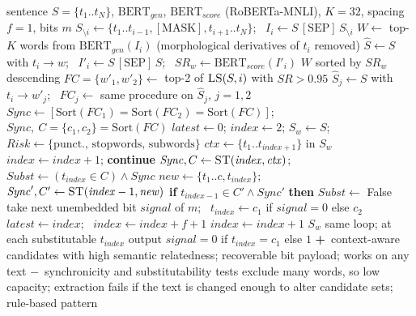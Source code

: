 \documentclass[10pt,a4paper,twocolumn]{article}
\newcommand{\pro}[1]{\Statex\textcolor{proc}{\textbf{+}\ #1}}
\newcommand{\con}[1]{\Statex\textcolor{conc}{\textbf{$-$}\ #1}}
\begin{document}
\begin{algorithm}[H]\small
\caption{Context-aware lexical substitution watermark (Yang et al.\ 2022)}
\begin{algorithmic}[1]
\Require sentence $S=\{t_1..t_N\}$, $\mathrm{BERT}_{gen}$, $\mathrm{BERT}_{score}$ (RoBERTa-MNLI), $K=32$, spacing $f=1$, bits $m$
 
 \State $S_{\setminus i}\gets\{t_1..t_{i-1},[\mathrm{MASK}],t_{i+1}..t_N\}$; \ $I_i\gets S\,[\mathrm{SEP}]\,S_{\setminus i}$
 \State $W\gets$ top-$K$ words from $\mathrm{BERT}_{gen}(I_i)$ (morphological derivatives of $t_i$ removed)
  \State $\hat S\gets S$ with $t_i\to w$; \ $I'_i\gets S\,[\mathrm{SEP}]\,\hat S$; \ $SR_w\gets\mathrm{BERT}_{score}(I'_i)$ 
 \EndFor
 \State \Return $W$ sorted by $SR_w$ descending
\EndFunction
{} 
 \State $FC=\{w'_1,w'_2\}\gets$ top-2 of $\textsc{LS}(S,i)$ with $SR>0.95$
 \State $\hat S_j\gets S$ with $t_i\to w'_j$; \ $FC_j\gets$ same procedure on $\hat S_j$, $j=1,2$
 \State $\mathit{Sync}\gets[\mathrm{Sort}(FC_1)=\mathrm{Sort}(FC_2)=\mathrm{Sort}(FC)]$; \ \Return $\mathit{Sync},\ C=\{c_1,c_2\}=\mathrm{Sort}(FC)$
\EndFunction
{}
 \State $\mathit{latest}\gets0$; $\mathit{index}\gets2$; $S_w\gets S$; $\mathit{Risk}\gets\{\text{punct., stopwords, subwords}\}$
  \State $\mathit{ctx}\gets\{t_1..t_{\mathit{index}+1}\}$ in $S_w$
   \State $\mathit{index}\gets\mathit{index}+1$; \textbf{continue} \EndIf
  \State $\mathit{Sync},C\gets\textsc{ST}(\mathit{index},\mathit{ctx})$; \ $\mathit{Subst}\gets(t_{\mathit{index}}\in C)\wedge\mathit{Sync}$
   
    \State $\mathit{new}\gets\{t_1..c,t_{\mathit{index}}\}$; \ $\mathit{Sync}',C'\gets\textsc{ST}(\mathit{index}-1,\mathit{new})$
    \State \textbf{if} $t_{\mathit{index}-1}\in C'\wedge\mathit{Sync}'$ \textbf{then} $\mathit{Subst}\gets$ False
   \EndFor
  \EndIf
   \State take next unembedded bit $\mathit{signal}$ of $m$; \ $t_{\mathit{index}}\gets c_1$ if $\mathit{signal}=0$ else $c_2$ 
   \State $\mathit{latest}\gets\mathit{index}$; \ $\mathit{index}\gets\mathit{index}+f+1$
  \Else \State $\mathit{index}\gets\mathit{index}+1$
  \EndIf
 \EndWhile
 \State \Return $S_w$
\EndProcedure
{} \State same loop; at each substitutable $t_{\mathit{index}}$ output $\mathit{signal}=0$ if $t_{\mathit{index}}=c_1$ else $1$ \EndProcedure
\pro{context-aware candidates with high semantic relatedness; recoverable bit payload; works on any text}
\con{synchronicity and substitutability tests exclude many words, so low capacity; extraction fails if the text is changed enough to alter candidate sets; rule-based pattern}
\end{algorithmic}
\end{algorithm}
\end{document}
